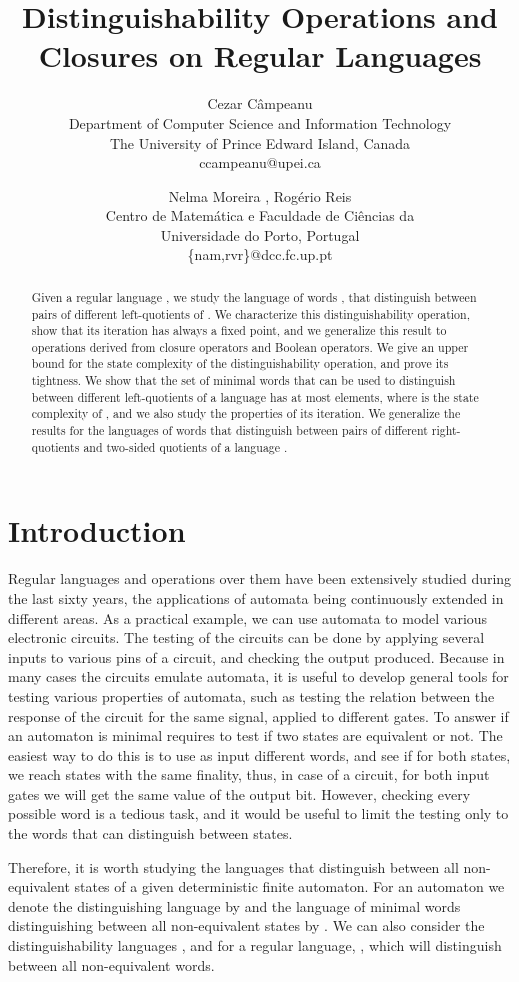 \documentclass{article}
\date{}
\title{Distinguishability Operations  and Closures on Regular Languages}
\author{Cezar C\^ampeanu \\
Department of Computer Science and Information Technology\\
The University of Prince Edward Island, Canada\\ccampeanu@upei.ca
 \and Nelma Moreira
, Rogério Reis\\
 Centro de Matem\'atica e Faculdade de Ci\^e{}ncias da\\
   Universidade do Porto, Portugal  \\
\{nam,rvr\}@dcc.fc.up.pt}
\begin{document}
\maketitle

\begin{abstract}
 Given a regular language , we study the language of words , that  distinguish between pairs of different
left-quotients of . We characterize this distinguishability
operation, show that its iteration has always a fixed point,
and we generalize this result to operations derived from closure operators 
and Boolean operators. 
We give an upper bound for the state complexity of the distinguishability operation, 
and prove its tightness.  
We show that the set of minimal words that can be used to distinguish 
between different left-quotients of a language  has at most  elements,
 where  is the state complexity of , and 
 we also study the properties of its iteration. We generalize the results for the languages of words that distinguish between pairs of different right-quotients and two-sided quotients of a language .
\end{abstract}

\section{Introduction}
\label{sec:intro}
Regular languages and operations over them have been extensively
studied  during the last sixty years, the applications of automata
being continuously extended in different areas. 
As a practical example, we can use automata to model various
electronic circuits. The testing of the circuits can be done by
applying several inputs to various pins of a circuit, and checking the output
produced. 
Because in many cases the circuits emulate automata, it is useful to
develop general tools for testing various properties of automata, such
as testing the relation between the response of the circuit for the
same signal, applied to different gates. 
To answer if an automaton is minimal requires to test if two states
are equivalent or not. 
The easiest way to do this is to use as input different words, and see if
for both states, we reach states with the same finality, thus, in case
of a circuit, for both input gates we will get the same value of the output bit.  
However, checking every possible word is a tedious task, and it would
be useful to limit the testing only to the words that can distinguish
between states. 

Therefore, it is worth studying the languages that distinguish between all
non-equivalent states of a given deterministic finite automaton. 
For an automaton   we denote the distinguishing  
language by  and the language of minimal words
distinguishing between all non-equivalent states by . We can also consider the distinguishability 
languages , and  for a regular language, ,
which will distinguish between all non-equivalent words.
\end{document}
